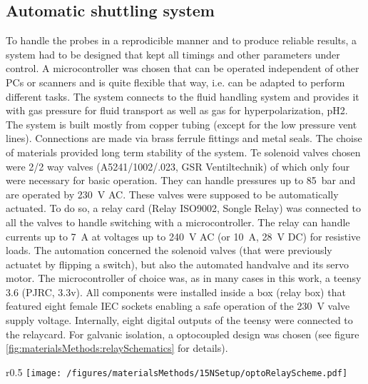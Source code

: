         \subsection{Automatic shuttling system}
        To handle the probes in a reprodicible manner and to produce reliable results, a system had to be designed that kept all timings and other parameters under control. A microcontroller was chosen that can be operated independent of other PCs or scanners and is quite flexible that way, i.e. can be adapted to perform different tasks.
        The system connects to the fluid handling system and provides it with gas pressure for fluid transport as well as gas for hyperpolarization, pH2. The system is built mostly from copper tubing (except for the low pressure vent lines). Connections are made via brass ferrule fittings and metal seals. The choise of materials provided long term stability of the system. Te solenoid valves chosen were 2/2 way valves (A5241/1002/.023, GSR Ventiltechnik) of which only four were necessary for basic operation. They can handle pressures up to \SI{85}{\bar} and are operated by \SI{230}{\volt} AC. These valves were supposed to be automatically actuated.
        To do so, a relay card (Relay ISO9002, Songle Relay) was connected to all the valves to handle switching with a microcontroller. The relay can handle currents up to \SI{7}{\ampere} at voltages up to \SI{240}{\volt} AC (or \SI{10}{\ampere}, \SI{28}{\volt} DC) for resistive loads. The automation concerned the solenoid valves (that were previously actuatet by flipping a switch), but also the automated handvalve and its servo motor. The microcontroller of choice was, as in many cases in this work, a teensy 3.6 (PJRC, 3.3v). All components were installed inside a box (relay box) that featured eight female IEC sockets enabling a safe operation of the \SI{230}{\volt} valve supply voltage.  Internally, eight digital outputs of the teensy were connected to the relaycard.  For galvanic isolation, a optocoupled design was chosen (see figure \ref{fig:materialsMethods:relaySchematics} for details).
        \begin{wrapfigure}{r}{0.5\textwidth}
                \texttt{[image: /figures/materialsMethods/15NSetup/optoRelayScheme.pdf]}
                \caption[Relay schematics]{One relay module of which 8 were mounted onto a single PCB board in this case. Note the galvanic isolation through the optocoupler in the top center of the schematics.}
                \label{fig:materialsMethods:relaySchematics}
            \end{wrapfigure}
